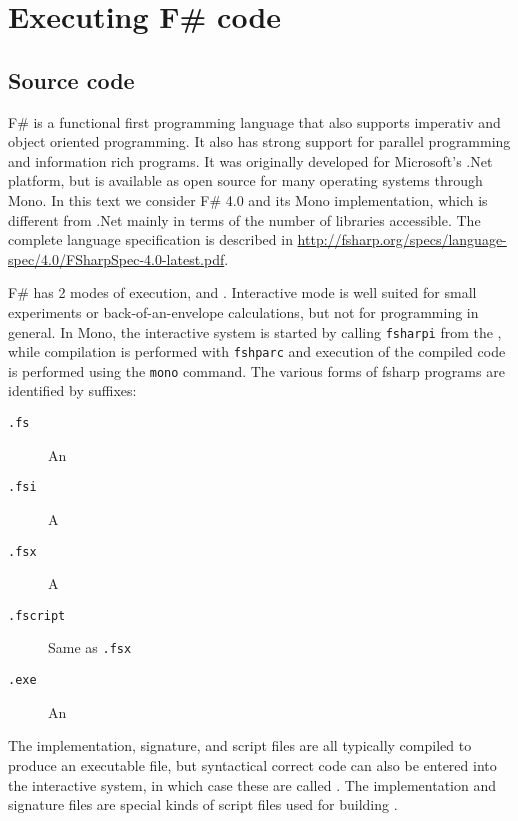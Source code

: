 \chapter{Executing F\# code}

\section{Source code}
F\# is a functional first programming language that also supports imperativ and object oriented programming. It also has strong support for parallel programming and information rich programs. It was originally developed for Microsoft's .Net platform, but is available as open source for many operating systems through Mono. In this text we consider F\# 4.0 and its Mono implementation, which is different from .Net mainly in terms of the number of libraries accessible. The complete language specification is described in \url{http://fsharp.org/specs/language-spec/4.0/FSharpSpec-4.0-latest.pdf}. 

F\# has 2 modes of execution,  and . Interactive mode is well suited for small experiments or back-of-an-envelope calculations, but not for programming in general. In Mono, the interactive system is started by calling \texttt{fsharpi} from the , while compilation is performed with \texttt{fshparc} and execution of the compiled code is performed using the \texttt{mono} command. The various forms of fsharp programs are identified by suffixes:
\begin{description}
\item[\texttt{.fs}] An 
\item[\texttt{.fsi}] A 
\item[\texttt{.fsx}] A 
\item[\texttt{.fscript}] Same as \texttt{.fsx}
\item[\texttt{.exe}] An 
\end{description}
The implementation, signature, and script files are all typically compiled to produce an executable file, but syntactical correct code can also be entered into the interactive system, in which case these are called . The implementation and signature files are special kinds of script files used for building .

